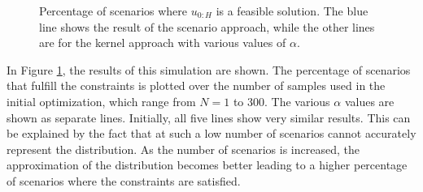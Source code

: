 \begin{figure}[t!]
		\def\file{data/AlphaTest_K300_MaxConstraint_S2.txt}
		
		\centering
		\vspace*{-0.4cm}
		
		\caption{Percentage of scenarios where $u_{0:H}$ is a feasible solution. The blue line shows the result of the scenario approach, while the other lines are for the kernel approach with various values of $\alpha$.}
		\label{fig:robustness_plot}
\end{figure}


In Figure \ref{fig:robustness_plot}, the results of this simulation are shown. The percentage of scenarios that fulfill the constraints is plotted over the number of samples used in the initial optimization, which range from $N = 1$ to 300. The various $\alpha$ values are shown as separate lines. Initially, all five lines show very similar results. This can be explained by the fact that at such a low number of scenarios cannot accurately represent the distribution. As the number of scenarios is increased, the approximation of the distribution becomes better leading to a higher percentage of scenarios where the constraints are satisfied.

